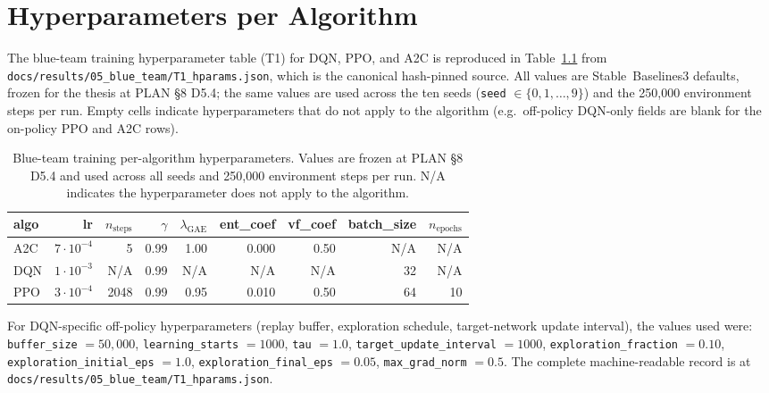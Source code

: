 \chapter{Hyperparameters per Algorithm}\label{app:hparams}

The blue-team training hyperparameter table (T1) for DQN, PPO, and A2C is reproduced in Table~\ref{tab:hparams} from \texttt{docs/results/05\_blue\_team/T1\_hparams.json}, which is the canonical hash-pinned source. All values are Stable~Baselines3 defaults, frozen for the thesis at PLAN \S8 D5.4; the same values are used across the ten seeds (\texttt{seed} $\in \{0, 1, \ldots, 9\}$) and the 250{,}000 environment steps per run. Empty cells indicate hyperparameters that do not apply to the algorithm (e.g.\ off-policy DQN-only fields are blank for the on-policy PPO and A2C rows).

\begin{table}[!htbp]
\centering
\caption{Blue-team training per-algorithm hyperparameters. Values are frozen at PLAN \S8 D5.4 and used across all \NumSeeds{} seeds and 250{,}000 environment steps per run. N/A indicates the hyperparameter does not apply to the algorithm.}
\label{tab:hparams}
\small
\begin{tabular}{l r r r r r r r r}
\toprule
algo & lr & $n_{\text{steps}}$ & $\gamma$ & $\lambda_{\text{GAE}}$ & ent\_coef & vf\_coef & batch\_size & $n_{\text{epochs}}$ \\
\midrule
A2C & $7\!\cdot\!10^{-4}$ & 5    & 0.99 & 1.00 & 0.000 & 0.50 & N/A  & N/A  \\
DQN & $1\!\cdot\!10^{-3}$ & N/A  & 0.99 & N/A  & N/A   & N/A  & 32   & N/A  \\
PPO & $3\!\cdot\!10^{-4}$ & 2048 & 0.99 & 0.95 & 0.010 & 0.50 & 64   & 10   \\
\bottomrule
\end{tabular}
\end{table}
\par\smallskip{}

For DQN-specific off-policy hyperparameters (replay buffer, exploration schedule, target-network update interval), the values used were: \texttt{buffer\_size} $= 50{,}000$, \texttt{learning\_starts} $= 1000$, \texttt{tau} $= 1.0$, \texttt{target\_update\_interval} $= 1000$, \texttt{exploration\_fraction} $= 0.10$, \texttt{exploration\_initial\_eps} $= 1.0$, \texttt{exploration\_final\_eps} $= 0.05$, \texttt{max\_grad\_norm} $= 0.5$. The complete machine-readable record is at \texttt{docs/results/05\_blue\_team/T1\_hparams.json}.

